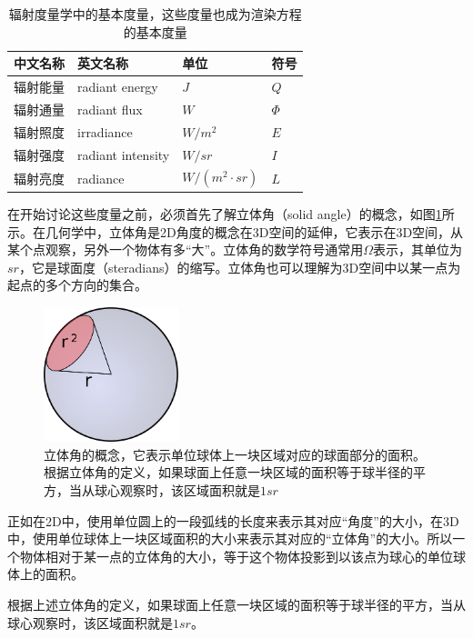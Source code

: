 \begin{table}
\caption{辐射度量学中的基本度量，这些度量也成为渲染方程的基本度量}
\label{t:radiometric-quantities}

\begin{tabular}{p{}|p{}|p{}|p{}}
\hline
   中文名称&英文名称&单位&符号  \\
  \hline
  辐射能量&radiant energy & $J$& $Q$\\
  辐射通量&radiant flux & $W$  & $\Phi$\\
  辐射照度&irradiance & $W/m^2$ & $E$\\
  辐射强度&radiant intensity & $W/sr$ & $I$\\
  辐射亮度&radiance & $W/(m^2\cdot sr)$& $L$\\
\hline
\end{tabular}
\end{table}

在开始讨论这些度量之前，必须首先了解立体角（solid angle）的概念，如图\ref{f:intro-solid-angle}所示。在几何学中，立体角是2D角度的概念在3D空间的延伸，它表示在3D空间，从某个点观察，另外一个物体有多“大”。立体角的数学符号通常用$\Omega$表示，其单位为$sr$，它是球面度（steradians）的缩写。立体角也可以理解为3D空间中以某一点为起点的多个方向的集合。

\begin{figure}
\sidecaption
	\includegraphics[width=0.35\textwidth]{figures/intro/solid-angle}
	\caption{立体角的概念，它表示单位球体上一块区域对应的球面部分的面积。根据立体角的定义，如果球面上任意一块区域的面积等于球半径的平方，当从球心观察时，该区域面积就是$1sr$}
	\label{f:intro-solid-angle}
\end{figure}

正如在2D中，使用单位圆上的一段弧线的长度来表示其对应“角度”的大小，在3D中，使用单位球体上一块区域面积的大小来表示其对应的“立体角”的大小。所以一个物体相对于某一点的立体角的大小，等于这个物体投影到以该点为球心的单位球体上的面积。

根据上述立体角的定义，如果球面上任意一块区域的面积等于球半径的平方，当从球心观察时，该区域面积就是$1sr$。

